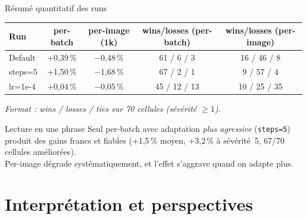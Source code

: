 \documentclass[10pt,aspectratio=169]{beamer}
\newcommand{\good}[1]{\textcolor{green!50!black}{#1}}
\newcommand{\bad}[1]{\textcolor{red!70!black}{#1}}
\newcommand{\code}[1]{\texttt{\small #1}}
\begin{document}
\begin{frame}{Résumé quantitatif des runs}
  \centering
  \small
  \begin{tabular}{lcccc}
    \toprule
    Run & per-batch & per-image (1k) & wins/losses (per-batch) & wins/losses (per-image) \\
    \midrule
    Default            & \good{+0,39\,\%} & \bad{$-$0,48\,\%} & 61 / 6 / 3   & 16 / 46 / 8 \\
    steps=5            & \good{+1,50\,\%} & \bad{$-$1,68\,\%} & \good{67 / 2 / 1} & \bad{9 / 57 / 4} \\
    lr=1e-4            & +0,04\,\%        & $-$0,05\,\%       & 45 / 12 / 13 & 10 / 25 / 35 \\
    \bottomrule
  \end{tabular}
  \par\vspace{0.2em}\scriptsize{\emph{Format : wins / losses / ties sur 70 cellules (sévérité $\geq 1$).}}

  \vspace{0.7em}
  \begin{block}{Lecture en une phrase}
    Seul \alert{per-batch avec adaptation \emph{plus agressive} (\code{steps=5})} produit des gains francs et fiables (+1,5\,\% moyen, +3,2\,\% à sévérité~5, 67/70 cellules améliorées). \\ Per-image dégrade systématiquement, et l'effet s'aggrave quand on adapte plus.
  \end{block}
\end{frame}

\section{Interprétation et perspectives}
\end{document}
